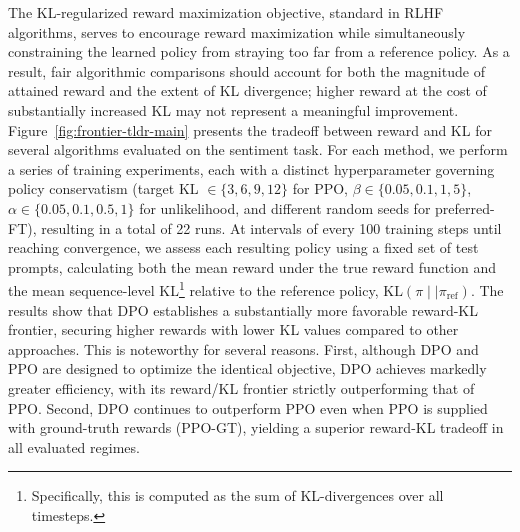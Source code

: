 The KL-regularized reward maximization objective, standard in RLHF algorithms, serves to encourage reward maximization while simultaneously constraining the learned policy from straying too far from a reference policy. As a result, fair algorithmic comparisons should account for both the magnitude of attained reward and the extent of KL divergence; higher reward at the cost of substantially increased KL may not represent a meaningful improvement. Figure~\ref{fig:frontier-tldr-main} presents the tradeoff between reward and KL for several algorithms evaluated on the sentiment task. For each method, we perform a series of training experiments, each with a distinct hyperparameter governing policy conservatism (target KL $\in\{3,6,9,12\}$ for PPO, $\beta \in \{0.05,0.1,1,5\}$, $\alpha\in\{0.05,0.1,0.5,1\}$ for unlikelihood, and different random seeds for preferred-FT), resulting in a total of 22 runs. At intervals of every 100 training steps until reaching convergence, we assess each resulting policy using a fixed set of test prompts, calculating both the mean reward under the true reward function and the mean sequence-level KL\footnote{Specifically, this is computed as the sum of KL-divergences over all timesteps.} relative to the reference policy, $\text{KL}\left(\pi\mid \mid \pi_\text{ref}\right)$. The results show that DPO establishes a substantially more favorable reward-KL frontier, securing higher rewards with lower KL values compared to other approaches. This is noteworthy for several reasons. First, although DPO and PPO are designed to optimize the identical objective, DPO achieves markedly greater efficiency, with its reward/KL frontier strictly outperforming that of PPO. Second, DPO continues to outperform PPO even when PPO is supplied with ground-truth rewards (PPO-GT), yielding a superior reward-KL tradeoff in all evaluated regimes.

